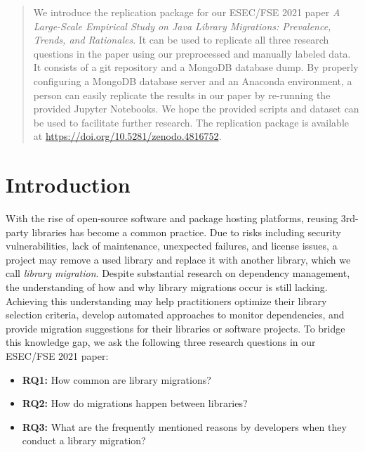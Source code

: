 \documentclass[sigconf]{acmart}
\begin{document}
\begin{abstract}
We introduce the replication package for our ESEC/FSE 2021 paper \textit{A Large-Scale Empirical Study on Java Library Migrations: Prevalence, Trends, and Rationales}. 
It can be used to replicate all three research questions in the paper using our preprocessed and manually labeled data. 
It consists of a git repository and a MongoDB database dump. By properly configuring a MongoDB database server and an Anaconda environment, a person can easily replicate the results in our paper by re-running the provided Jupyter Notebooks.
We hope the provided scripts and dataset can be used to facilitate further research.
The replication package is available at \url{https://doi.org/10.5281/zenodo.4816752}.
\end{abstract}

\maketitle

\section{Introduction}

With the rise of open-source software and package hosting platforms, reusing 3rd-party libraries has become a common practice.
Due to risks including %
security vulnerabilities, lack of maintenance, unexpected failures, and license issues, a project may remove a used library and replace it with another library, which we call \textit{library migration}.
Despite substantial research on dependency management, the understanding of how and why library migrations occur is still lacking. 
Achieving this understanding may help practitioners optimize their library selection criteria, develop automated approaches to monitor dependencies, and provide migration suggestions for their libraries or software projects.
To bridge this knowledge gap, we ask the following three research questions in our ESEC/FSE 2021 paper:

\begin{itemize}
    \item \textbf{RQ1:} How common are library migrations?
    \item \textbf{RQ2:} How do migrations happen between libraries?
    \item \textbf{RQ3:} What are the frequently mentioned reasons by developers when they conduct a library migration?
\end{itemize}
\end{document}
